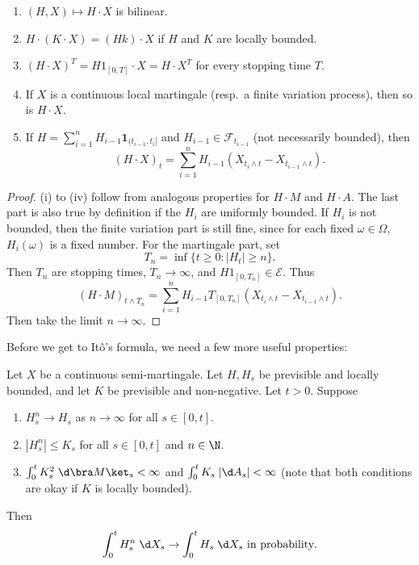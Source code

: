 \documentclass[a4paper]{article}
\begin{document}
\begin{prop}\leavevmode
  \begin{enumerate}
    \item $(H, X) \mapsto H \cdot X$ is bilinear.
    \item $H \cdot (K \cdot X) = (Hk) \cdot X$ if $H$ and $K$ are locally bounded.
    \item $(H \cdot X)^T = H1_{[0, T]} \cdot X = H \cdot X^T$ for every stopping time $T$.
    \item If $X$ is a continuous local martingale (resp.\ a finite variation process), then so is $H \cdot X$.
    \item If $H = \sum_{i = 1}^n H_{i - 1} \mathbf{1}_{(t_{i - 1}, t_i]}$ and $H_{i - 1} \in \mathcal{F}_{t_{i - 1}}$ (not necessarily bounded), then
      \[
        (H \cdot X)_t = \sum_{i = 1}^n H_{i - 1}(X_{t_i \wedge t} - X_{t_{i - 1} \wedge t}).
      \]
  \end{enumerate}
\end{prop}
\begin{proof}
  (i) to (iv) follow from analogous properties for $H \cdot M$ and $H \cdot A$. The last part is also true by definition if the $H_i$ are uniformly bounded. If $H_i$ is not bounded, then the finite variation part is still fine, since for each fixed $\omega \in \Omega$, $H_i(\omega)$ is a fixed number. For the martingale part, set
  \[
    T_n = \inf \{t \geq 0 : |H_t| \geq n\}.
  \]
  Then $T_n$ are stopping times, $T_n \to \infty$, and $H1_{[0, T_n]} \in \mathcal{E}$. Thus
  \[
    (H \cdot M)_{t \wedge T_n} = \sum_{i = 1}^n H_{i - 1} T_{[0, T_n]} (X_{t_i \wedge t} - X_{t_{i - 1}\wedge t}).
  \]
  Then take the limit $n \to \infty$.
\end{proof}

Before we get to It\^o's formula, we need a few more useful properties:
\begin{prop}
  Let $X$ be a continuous semi-martingale. Let $H, H_s$ be previsible and locally bounded, and let $K$ be previsible and non-negative. Let $t > 0$. Suppose
  \begin{enumerate}
    \item $H_s^n \to H_s$ as $n \to \infty$ for all $s \in [0, t]$.
    \item $|H_s^n| \leq K_s$ for all $s \in [0, t]$ and $n \in \N$.
    \item $\int_0^t K_s^2\;\d \bra M\ket_s < \infty$ and $\int_0^t K_s \;|\d A_s|< \infty$ (note that both conditions are okay if $K$ is locally bounded).
  \end{enumerate}
  Then
  \[
    \int_0^t H_s^n \;\d X_s \to \int_0^t H_s\;\d X_s \text{ in probability}.
  \]
\end{prop}
\end{document}
